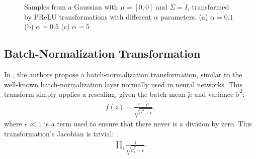 \begin{figure}[!htb]
  \begin{subfigmatrix}{3}
  \end{subfigmatrix}
    \caption{Samples from a Gaussian with $\mu = [0, 0]$ and $\Sigma = I$, transformed
    by PReLU transformations with different $\alpha$ parameters. (a) $\alpha = 0.1$
    (b) $\alpha = 0.5$ (c) $\alpha = 5$}
  \label{fig:prelu}
\end{figure}

\subsection{Batch-Normalization Transformation}
In \autocite{real-nvp}, the authors propose a batch-normalization transformation, similar to
the well-known batch-normalization layer normally used in neural networks. This
transform simply applies a rescaling, given the batch mean $\tilde\mu$ and variance
${\tilde\sigma}^2$:
\begin{align}
    f(z) = \frac{z - \tilde\mu}{\sqrt{{\tilde\sigma}^2 + \epsilon}},
\end{align} where $\epsilon \ll 1$ is a term used to ensure that there never is
a division by zero. This transformation's Jacobian is trivial: 
\begin{align}
    \prod_i \frac{1}{\sqrt{{\tilde\sigma}_i^2 + \epsilon}}.
\end{align}

